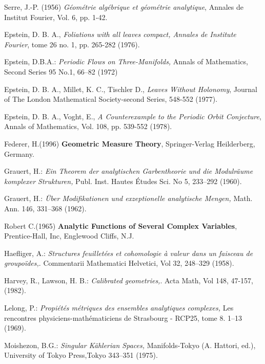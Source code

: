 \documentclass[12pt,twoside,a4paper]{report}
\begin{document}
 Serre, J.-P. (1956) \textit{G\'eom\'etrie alg\'ebrique et
g\'eom\'etrie analytique}, Annales de Institut Fourier, Vol. 6, pp. 1-42. 








 Epstein, D. B. A., {\it Foliations with all leaves compact, Annales de Institute Fourier},
tome 26 no. 1, pp. 265-282 (1976).

Epstein, D.B.A.: {\it Periodic Flows on Three-Manifolds,} Annals of Mathematics, Second Series 95 No.1, 66–82 (1972)

 Epstein, D. B. A., Millet, K. C., Tischler D., {\it Leaves Without Holonomy}, Journal of The London Mathematical Society-second Series, 548-552 (1977).

 Epstein, D. B. A., Voght, E., {\it A Counterexample to the Periodic Orbit Conjecture}, 
Annals of Mathematics, Vol. 108, pp. 539-552 (1978). 

 Federer, H.(1996) {\bf Geometric Measure Theory}, Springer-Verlag Heilderberg, Germany.

 Grauert, H.: {\it Ein Theorem der analytischen Garbentheorie und die Modulräume komplexer Strukturen,} Publ. Inst. Hautes Études Sci. No 5, 233--292 (1960).

 Grauert, H.: {\it Über Modifikationen und exzeptionelle analytische Mengen,} Math. Ann. 146, 331–368 (1962). 

 Robert C.(1965) {\bf Analytic Functions of Several Complex Variables}, Prentice-Hall, Inc, Englewood Cliffs, N.J. 

 Haefliger, A.: {\it Structures feuilletées et cohomologie à valeur dans un faisceau de groupoïdes,}.
Commentarii Mathematici Helvetici, Vol 32, 248--329 (1958).

 Harvey, R., Lawson, H. B.: {\it Calibrated geometries,}.
Acta Math, Vol 148, 47-157, (1982).

 Lelong, P.:{ \it Propiétés métriques des ensembles analytiques complexes,} Les rencontres physiciens-mathématiciens de Strasbourg - RCP25, tome 8. 1--13 (1969).

 Moishezon, B.G.: {\it Singular Kählerian Spaces,} Manifolds-Tokyo (A. Hattori, ed.), University of Tokyo Press,Tokyo 343--351 (1975).
\end{document}
